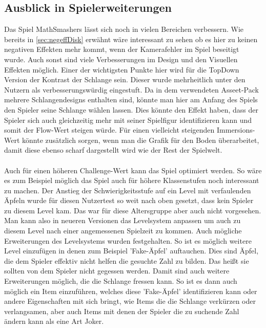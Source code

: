 \subsection{Ausblick in Spielerweiterungen}
Das Spiel MathSmashers lässt sich noch in vielen Bereichen verbessern. Wie bereits in \ref{sec:negeffDisk} erwähnt wäre interessant zu sehen ob es hier zu keinen negativen Effekten mehr kommt, wenn der Kamerafehler im Spiel beseitigt wurde. Auch sonst sind viele Verbesserungen im Design und den Visuellen Effekten möglich. Einer der wichtigsten Punkte hier wird für die TopDown Version der Kontrast der Schlange sein. Dieser wurde mehrheitlich unter den Nutzern als verbesserungswürdig eingestuft. Da in dem verwendeten Asseet-Pack mehrere Schlangendesigns enthalten sind, könnte man hier am Anfang des Spiels den Spieler seine Schlange wählen lassen. Dies könnte den Effekt haben, dass der Spieler sich auch gleichzeitig mehr mit seiner Spielfigur identifizieren kann und somit der Flow-Wert steigen würde. Für einen vielleicht steigenden Immersions-Wert könnte zusätzlich sorgen, wenn man die Grafik für den Boden überarbeitet, damit diese ebenso scharf dargestellt wird wie der Rest der Spielwelt.\\
\\
Auch für einen höheren Challenge-Wert kann das Spiel optimiert werden. So wäre es zum Beispiel möglich das Spiel auch für höhere Klassenstufen noch interessant zu machen. Der Anstieg der Schwierigkeitsstufe auf ein Level mit verfaulenden Äpfeln wurde für diesen Nutzertest so weit nach oben gesetzt, dass kein Spieler zu diesem Level kam. Das war für diese Altersgruppe aber auch nicht vorgesehen. Man kann also in neueren Versionen das Levelsystem anpassen um auch zu diesem Level nach einer angemessenen Spielzeit zu kommen. Auch mögliche Erweiterungen des Levelsystems wurden festgehalten. So ist es möglich weitere Level einzufügen in denen zum Beispiel 'Fake-Äpfel' auftauchen. Dies sind Äpfel, die dem Spieler effektiv nicht helfen die gesuchte Zahl zu bilden. Das heißt sie sollten von dem Spieler nicht gegessen werden. Damit sind auch weitere Erweiterungen möglich, die die Schlange fressen kann. So ist es dann auch möglich ein Item einzuführen, welches diese 'Fake-Äpfel' identifizieren kann oder andere Eigenschaften mit sich bringt, wie Items die die Schlange verkürzen oder verlangsamen, aber auch Items mit denen der Spieler die zu suchende Zahl ändern kann als eine Art Joker.
